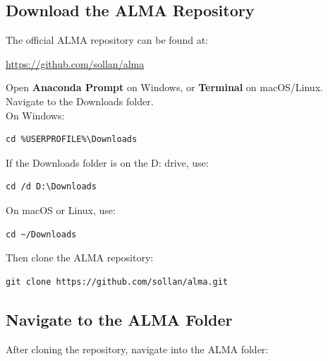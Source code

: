 \documentclass[11pt]{article}
\renewcommand{\[}{%
  \par\smallskip\noindent
  \begin{center}%
  \setlength{\fboxsep}{5pt}%
  \setlength{\fboxrule}{0.35pt}%
  \begin{lrbox}{\almaEquationBox}%
  $\displaystyle
}
\renewcommand{\]}{%
  $%
  \end{lrbox}%
  \fcolorbox{equationLine}{equationBack}{\usebox{\almaEquationBox}}%
  \end{center}%
  \smallskip\par
}
\begin{document}
\subsection{Download the ALMA Repository}

The official ALMA repository can be found at:

\begin{tcolorbox}
\url{https://github.com/sollan/alma}
\end{tcolorbox}

\noindent Open \textbf{Anaconda Prompt} on Windows, or \textbf{Terminal} on macOS/Linux. Navigate to the Downloads folder.
\\
\noindent On Windows:

\begin{tcolorbox}
\begin{verbatim}
cd %USERPROFILE%\Downloads
\end{verbatim}
\end{tcolorbox}

\noindent If the Downloads folder is on the D: drive, use:

\begin{tcolorbox}
\begin{verbatim}
cd /d D:\Downloads
\end{verbatim}
\end{tcolorbox}

\noindent On macOS or Linux, use:

\begin{tcolorbox}
\begin{verbatim}
cd ~/Downloads
\end{verbatim}
\end{tcolorbox}

\noindent Then clone the ALMA repository:

\begin{tcolorbox}
\begin{verbatim}
git clone https://github.com/sollan/alma.git
\end{verbatim}
\end{tcolorbox}

\subsection{Navigate to the ALMA Folder}

After cloning the repository, navigate into the ALMA folder:
\end{document}
